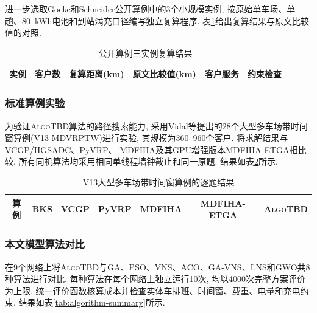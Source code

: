 \documentclass{setp-new}
\newcommand{\setptabsetup}{\fontsize{9pt}{10.5pt}\selectfont\renewcommand{\arraystretch}{0.90}\setlength{\tabcolsep}{2.2pt}\setlength{\aboverulesep}{0.4pt}\setlength{\belowrulesep}{0.4pt}\hbadness=10000}
\begin{document}
进一步选取Goeke和Schneider\cite{ref:27,ref:28}公开算例中的3个小规模实例,
按原始单车场、单趟、80~kWh电池和到站满充口径编写独立复算程序.
表\ref{tab:public-adapter-gate}给出复算结果与原文比较值的对照.

\begin{table}[H]
\centering
\caption{公开算例三实例复算结果}
\label{tab:public-adapter-gate}
\setptabsetup
\begin{tabular}{@{}cccccc@{}}
\toprule
实例 & 客户数 & 复算距离(km) & 原文比较值(km) & 客户服务 & 约束检查\\
\midrule
\bottomrule
\end{tabular}
\end{table}

\subsubsection{标准算例实验}

为验证\textsc{AlgoTBD}算法的路径搜索能力,
采用Vidal等\cite{ref:74}提出的28个大型多车场带时间窗算例(V13-MDVRPTW)进行实验,
其规模为360--960个客户.
将求解结果与VCGP/HGSADC\cite{ref:74}、PyVRP\cite{ref:64}、
MDFIHA及其GPU增强版本MDFIHA-ETGA\cite{ref:75}相比较.
所有同机算法均采用相同单线程墙钟截止和同一原题.
结果如表\ref{tab:v13-results}所示.

\begin{table}[H]
\centering
\caption{V13大型多车场带时间窗算例的逐题结果}
\label{tab:v13-results}
\setptabsetup
\begin{tabular}{@{}ccccccc@{}}
\toprule
算例 & BKS & VCGP & PyVRP & MDFIHA & MDFIHA-ETGA & \textsc{AlgoTBD}\\
\midrule
\bottomrule
\end{tabular}
\end{table}

\subsubsection{本文模型算法对比}

在9个网络上将\textsc{AlgoTBD}与GA、PSO、VNS、ACO、GA-VNS、LNS和GWO共8种算法进行对比.
每种算法在每个网络上独立运行10次, 均以4000次完整方案评价为上限.
统一评价函数核算成本并检查实体车排班、时间窗、载重、电量和充电约束.
结果如表\ref{tab:algorithm-summary}所示.
\end{document}
